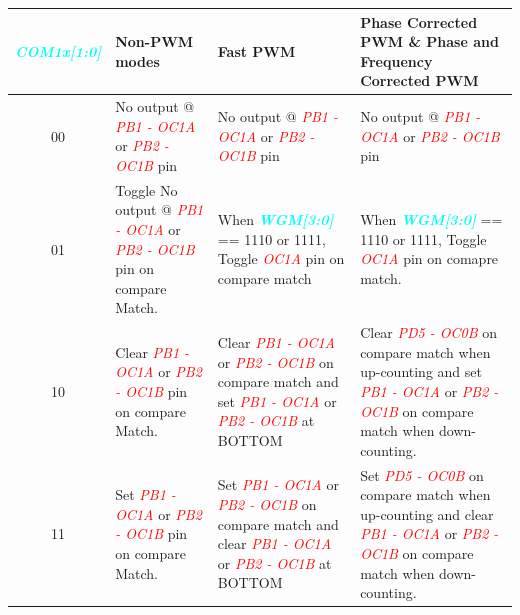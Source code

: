 \documentclass{article}
\newcommand{\bitFormat}[1]{\emph{\textbf{\textcolor{cyan}{#1}}}}
\newcommand{\pinFormat}[1]{\emph{\textcolor{red}{#1}}}
\begin{document}
\begin{table}[H]
    \begin{center}
        \begin{tabular}{c|p{4cm}|p{5.2cm}|p{5.2cm}}
            \bitFormat{COM1x[1:0]} & \textbf{Non-PWM modes} & \textbf{Fast PWM} & \textbf{Phase Corrected PWM \& Phase and Frequency Corrected PWM}\\
            \hline
            00 & No output @ \pinFormat{PB1 - OC1A} or \pinFormat{PB2 - OC1B} pin &   No output @ \pinFormat{PB1 - OC1A} or \pinFormat{PB2 - OC1B} pin & No output @ \pinFormat{PB1 - OC1A} or \pinFormat{PB2 - OC1B} pin \\
            \hline
            01 & Toggle  No output @ \pinFormat{PB1 - OC1A} or \pinFormat{PB2 - OC1B} pin on compare Match. & When \bitFormat{WGM[3:0]} == 1110 or 1111, Toggle \pinFormat{OC1A} pin on compare match & When \bitFormat{WGM[3:0]} == 1110 or 1111, Toggle \pinFormat{OC1A} pin on comapre match.\\
            \hline
            10 & Clear \pinFormat{PB1 - OC1A} or \pinFormat{PB2 - OC1B} pin on compare Match. & Clear \pinFormat{PB1 - OC1A} or \pinFormat{PB2 - OC1B} on compare match and  set \pinFormat{PB1 - OC1A} or \pinFormat{PB2 - OC1B} at BOTTOM & Clear \pinFormat{PD5 - OC0B} on compare match when up-counting and set \pinFormat{PB1 - OC1A} or \pinFormat{PB2 - OC1B} on compare match when down-counting.\\
            \hline
            11 & Set \pinFormat{PB1 - OC1A} or \pinFormat{PB2 - OC1B} pin on compare Match. & Set \pinFormat{PB1 - OC1A} or \pinFormat{PB2 - OC1B} on compare match and clear \pinFormat{PB1 - OC1A} or \pinFormat{PB2 - OC1B} at BOTTOM & Set \pinFormat{PD5 - OC0B} on compare match when up-counting and clear \pinFormat{PB1 - OC1A} or \pinFormat{PB2 - OC1B} on compare match when down-counting.\\
        \end{tabular}
    \end{center}
\end{table}
\end{document}
